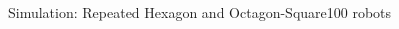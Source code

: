 \begin{frame}{Simulation: Repeated Hexagon and Octagon-Square}{100 robots}
  \begin{columns}[T] %
    \begin{column}{.45\textwidth}
    \end{column}%
    \begin{column}{.45\textwidth}
    \end{column}%
  \end{columns}
\end{frame}